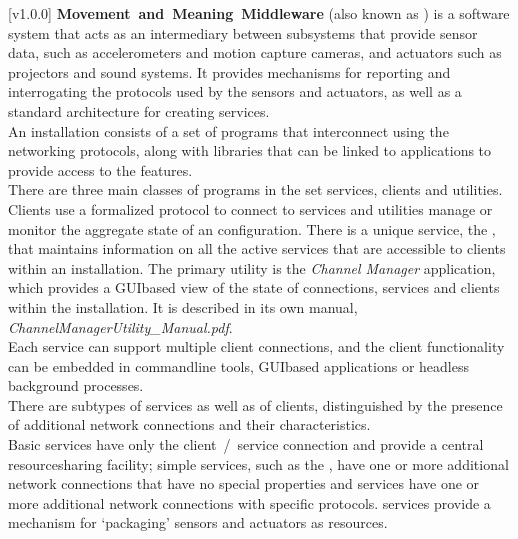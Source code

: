 [v1.0.0]
\textbf{Movement~and~Meaning~Middleware} (also known as \mplusm{}) is a software system
that acts as an intermediary between subsystems that provide sensor data, such as
accelerometers and motion capture cameras, and actuators such as projectors and sound
systems.
It provides mechanisms for reporting and interrogating the protocols used by the sensors
and actuators, as well as a standard architecture for creating services.\\

An \mplusm{} installation consists of a set of programs that interconnect using the
 networking
protocols, along with libraries that can be linked to applications to provide access to
the \mplusm{} features.\\

There are three main classes of programs in the set \longDash{} services, clients and
utilities.
Clients use a formalized protocol to connect to services and utilities manage or monitor
the aggregate state of an \mplusm{} configuration.
There is a unique service, the , that
maintains information on all the active services that are accessible to clients within an
\mplusm{} installation.
The primary utility is the \emph{Channel Manager} application, which provides a
GUI\longDash{}based view of the state of connections, services and clients within the
installation.
It is described in its own manual, \emph{ChannelManagerUtility\_Manual.pdf}.\\

Each service can support multiple client connections, and the client functionality can be
embedded in command\longDash{}line tools, GUI\longDash{}based applications or headless
background processes.\\

There are subtypes of services as well as of clients, distinguished by the presence of
additional \yarp{} network connections and their characteristics.\\

Basic services have only the client~/~service \yarp{} connection and provide a central
resource\longDash{}sharing facility; simple services, such as the
, have one or more additional \yarp{}
network connections that have no special properties and  services have one
or more additional \yarp{} network connections with specific protocols.
 services provide a mechanism for `packaging' sensors and actuators as
\mplusm{} resources.\\

